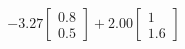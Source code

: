 \documentclass[preview]{standalone}
\begin{document}
\begin{align*}
-3.27 \begin{bmatrix} 0.8 \\ 0.5 \end{bmatrix} + 2.00 \begin{bmatrix} 1 \\ 1.6 \end{bmatrix}
\end{align*}
\end{document}
